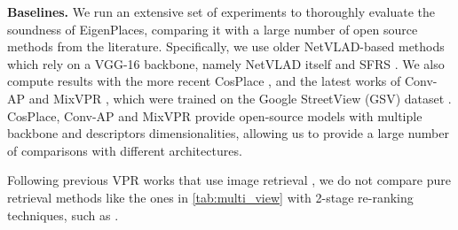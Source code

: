 \documentclass[10pt,twocolumn,letterpaper]{article}
\newcommand{\myparagraph}[1]{\vspace{4pt}\noindent\textbf{#1}}
\begin{document}
\myparagraph{Baselines.}
We run an extensive set of experiments to thoroughly evaluate the soundness of EigenPlaces, comparing it with a large number of open source methods from the literature.
Specifically, we use older NetVLAD-based methods which rely on a VGG-16 backbone, namely NetVLAD itself \cite{Arandjelovic_2018_netvlad} and SFRS \cite{Ge_2020_sfrs}.
We also compute results with the more recent CosPlace \cite{Berton_2022_cosPlace}, and the latest works of Conv-AP \cite{Alibey_2022_gsvcities} and MixVPR \cite{Alibey_2023_mixvpr}, which were trained on the Google StreetView (GSV) dataset \cite{Alibey_2022_gsvcities}.
CosPlace, Conv-AP and MixVPR provide open-source models with multiple backbone and descriptors dimensionalities, allowing us to provide a large number of comparisons with different architectures.

Following previous VPR works that use image retrieval \cite{Arandjelovic_2018_netvlad, Kim_2017_crn, Liu_2019_sare, Zhu_2018_apanet, Ge_2020_sfrs, Berton_2022_cosPlace, Alibey_2022_gsvcities, Peng_2021_appsvr, Peng_2021_sralNet, Yu_2020_SPEVlad}, we do not compare pure retrieval methods like the ones in \cref{tab:multi_view} with 2-stage re-ranking techniques, such as \cite{Hausler_2021_patch_netvlad, Wang_2022_TransVPR, Cao_2020_delg, Fuwen_2021_reranking_transformers}.
\end{document}

